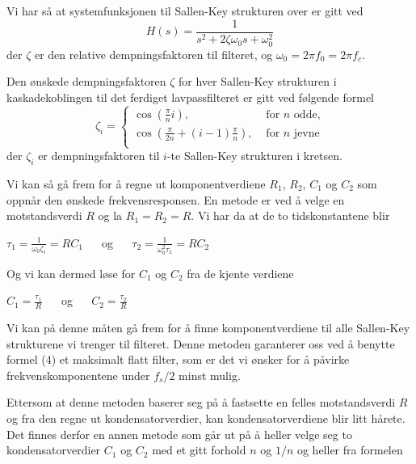 Vi har så at systemfunksjonen til Sallen-Key strukturen over er gitt ved
\begin{equation}
    H(s) = \frac{1}{s^2 + 2\zeta\omega_0 s + \omega_0^2}
\end{equation}
der $\zeta$ er den relative dempningsfaktoren til filteret, og $\omega_0 = 2\pi f_0 = 2\pi f_c$.

Den ønskede dempningsfaktoren $\zeta$ for hver Sallen-Key strukturen i kaskadekoblingen til det ferdiget 
lavpassfilteret er gitt ved følgende formel
\begin{equation}
    \zeta_i = \begin{cases}
        \cos\left(\frac{\pi}{n}i\right), & \text{ for $n$ odde,} \\
        \cos\left(\frac{\pi}{2n} + (i - 1)\frac{\pi}{n}\right), & \text{ for $n$ jevne} \\
    \end{cases}
    \label{eq:zeta}
\end{equation}
der $\zeta_i$ er dempningsfaktoren til $i$-te Sallen-Key strukturen i kretsen.

Vi kan så gå frem for å regne ut komponentverdiene $R_1$, $R_2$, $C_1$ og $C_2$ som oppnår den ønskede frekvensresponsen.
En metode er ved å velge en motstandsverdi $R$ og la $R_1 = R_2 = R$. Vi har da at de to tidskonstantene blir
\begin{center}
    $\tau_1 = \frac{1}{\omega_0 \zeta_i} = R C_1\:\:\:\:\:\:$ og $\:\:\:\:\:\: \tau_2 = \frac{1}{\omega_0^2\tau_1} = R C_2$
\end{center}

Og vi kan dermed løse for $C_1$ og $C_2$ fra de kjente verdiene
\begin{center}
    $C_1 = \frac{\tau_1}{R}\:\:\:\:\:\:$ og $\:\:\:\:\:\: C_2 = \frac{\tau_2}{R}$
\end{center}
Vi kan på denne måten gå frem for å finne komponentverdiene til alle Sallen-Key strukturene vi trenger til filteret.
Denne metoden garanterer oss ved å benytte formel (4) et maksimalt flatt filter, som er det vi ønsker for å påvirke 
frekvenskomponentene under $f_s/2$ minst mulig.

Ettersom at denne metoden baserer seg på å fastsette en felles motstandsverdi $R$ og fra den regne ut kondensatorverdier,
kan kondensatorverdiene blir litt hårete. Det finnes derfor en annen metode \cite{sallen-key-lowpass-wikipedia} som går ut på 
å heller velge seg to kondensatorverdier $C_1$ og $C_2$ med et gitt forhold $n$ og $1/n$ og heller fra formelen

